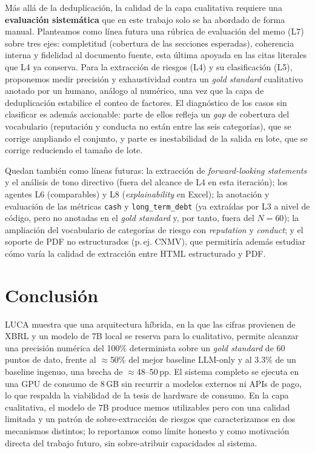 \documentclass[conference]{IEEEtran}
\begin{document}
Más allá de la deduplicación, la calidad de la capa cualitativa requiere una
\textbf{evaluación sistemática} que en este trabajo solo se ha abordado de forma
manual. Planteamos como línea futura una rúbrica de evaluación del memo (L7) sobre
tres ejes: completitud (cobertura de las secciones esperadas), coherencia interna
y fidelidad al documento fuente, esta última apoyada en las citas literales que
L4 ya conserva. Para la extracción de riesgos (L4) y su clasificación (L5),
proponemos medir precisión y exhaustividad contra un \textit{gold standard}
cualitativo anotado por un humano, análogo al numérico, una vez que la capa de
deduplicación estabilice el conteo de factores. El diagnóstico de los casos sin
clasificar es además accionable: parte de ellos refleja un \emph{gap} de cobertura
del vocabulario (reputación y conducta no están entre las seis categorías), que se
corrige ampliando el conjunto, y parte es inestabilidad de la salida en lote, que
se corrige reduciendo el tamaño de lote.

Quedan también como líneas futuras: la extracción de \textit{forward-looking
statements} y el análisis de tono directivo (fuera del alcance de L4 en esta
iteración); los agentes L6 (comparables) y L8 (\textit{explainability} en Excel);
la anotación y evaluación de las métricas \texttt{cash} y \texttt{long\_term\_debt}
(ya extraídas por L3 a nivel de código, pero no anotadas en el \textit{gold
standard} y, por tanto, fuera del $N=60$); la ampliación del vocabulario de
categorías de riesgo con \textit{reputation} y \textit{conduct}; y el soporte de
PDF no estructurados (p.\,ej. CNMV), que permitiría además estudiar cómo varía la
calidad de extracción entre HTML estructurado y PDF.

\section{Conclusión}
LUCA muestra que una arquitectura híbrida, en la que las cifras provienen de XBRL
y un modelo de 7B local se reserva para lo cualitativo, permite alcanzar una
precisión numérica del 100\% determinista sobre un \textit{gold standard} de 60
puntos de dato, frente al $\approx$50\% del mejor baseline LLM-only y al 3.3\% de
un baseline ingenuo, una brecha de $\approx$48--50\,pp. El sistema completo se
ejecuta en una GPU de consumo de 8\,GB sin recurrir a modelos externos ni APIs de
pago, lo que respalda la viabilidad de la tesis de hardware de consumo. En la capa
cualitativa, el modelo de 7B produce memos utilizables pero con una calidad
limitada y un patrón de sobre-extracción de riesgos que caracterizamos en dos
mecanismos distintos; lo reportamos como límite honesto y como motivación directa
del trabajo futuro, sin sobre-atribuir capacidades al sistema.
\end{document}
